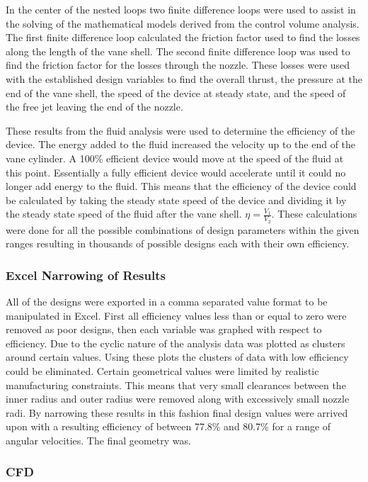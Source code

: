 \documentclass{report}
\begin{document}
In the center of the nested loops two finite difference loops were used to assist in the solving of the mathematical models derived from the control volume analysis. The first finite difference loop calculated the friction factor used to find the losses along the length of the vane shell. The second finite difference loop was used to find the friction factor for the losses through the nozzle. These losses were used with the established design variables to find the overall thrust, the pressure at the end of the vane shell, the speed of the device at steady state, and the speed of the free jet leaving the end of the nozzle.\par
These results from the fluid analysis were used to determine the efficiency of the device. The energy added to the fluid increased the velocity up to the end of the vane cylinder. A 100\% efficient device would move at the speed of the fluid at this point. Essentially a fully efficient device would accelerate until it could no longer add energy to the fluid. This means that the efficiency of the device could be calculated by taking the steady state speed of the device and dividing it by the steady state speed of the fluid after the vane shell. $\eta=\frac{V_1}{V_2}$. These calculations were done for all the possible combinations of design parameters within the given ranges resulting in thousands of possible designs each with their own efficiency.\par
\subsubsection{Excel Narrowing of Results}
All of the designs were exported in a comma separated value format to be manipulated in Excel. First all efficiency values less than or equal to zero were removed as poor designs, then each variable was graphed with respect to efficiency. Due to the cyclic nature of the analysis data was plotted as clusters around certain values. Using these plots the clusters of data with low efficiency could be eliminated. Certain geometrical values were limited by realistic manufacturing constraints. This means that very small clearances between the inner radius and outer radius were removed along with  excessively small nozzle radi. By narrowing these results in this fashion final design values were arrived upon with a resulting efficiency of between 77.8\% and 80.7\% for a range of angular velocities. The final geometry was.
\subsubsection{CFD}
\end{document}
